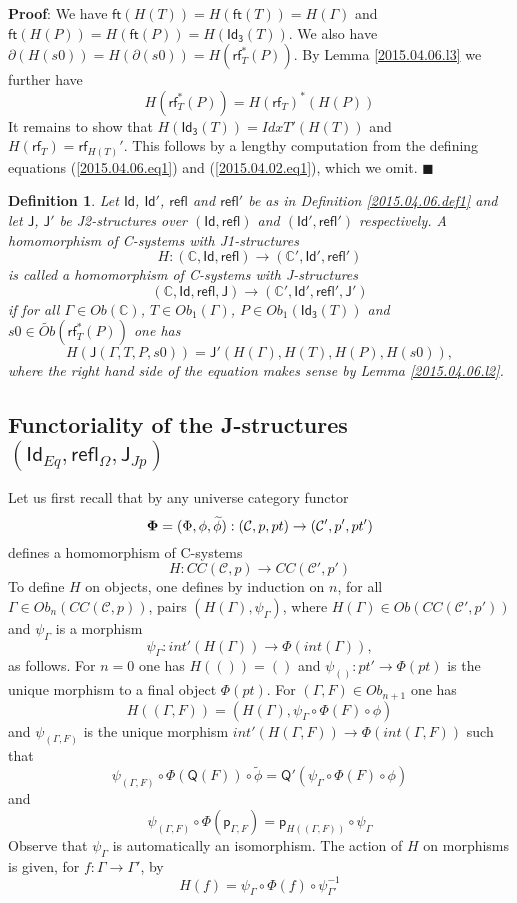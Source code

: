 \documentclass[12pt]{article}
\numberwithin{equation}{section}
\newenvironment{myproof}{{\bf Proof}:}{$\blacksquare$ \vskip 5mm }
\newtheorem{definition}[proposition]{Definition}
\newcommand{\sr}{\rightarrow}
\newcommand{\wt}{\widetilde}
\newcommand{\toCC}{CC} %
\newcommand{\CC}{{\mathbb C}}  %
\newcommand{\C}{{\mathcal C}}  %
\newcommand{\ft}{\mathsf{ft}}
\newcommand{\p}{\mathsf{p}}
\newcommand{\Id}{\mathsf{Id}} %
\newcommand{\Idx}{\mathsf{Id_3}} %
\newcommand{\refl}{\mathsf{refl}}
\newcommand{\J}{\mathsf{J}}
\newcommand{\rf}{\mathsf{rf}}
\newcommand{\Q}{\mathsf{Q}}
\newcommand{\Obwt}{\wt{Ob}}
\begin{document}
%
\begin{myproof}
We have $\ft(H(T))=H(\ft(T))=H(\Gamma)$ and $\ft(H(P))=H(\ft(P))=H(\Idx(T))$. We
also have $\partial(H(s0))=H(\partial(s0))=H(\rf_T^*(P))$. By Lemma
\ref{2015.04.06.l3} we further have
%
$$H(\rf_T^*(P))=H(\rf_T)^*(H(P))$$
%
It remains to show that $H(\Idx(T))=IdxT'(H(T))$ and $H(\rf_T)=\rf_{H(T)}'$. This
follows by a lengthy computation from the defining
equations (\ref{2015.04.06.eq1}) and (\ref{2015.04.02.eq1}), which we omit.
\end{myproof}
%
\begin{definition}
\label{2015.04.06.def2} Let $\Id$, $\Id'$, $\refl$ and $\refl'$ be as in
Definition \ref{2015.04.06.def1} and let $\J$, $\J'$ be J2-structures over
$(\Id,\refl)$ and $(\Id',\refl')$ respectively. A homomorphism of C-systems with
J1-structures
%
$$H:(\CC,\Id,\refl)\sr (\CC',\Id',\refl')$$
%
is called a homomorphism of C-systems with J-structures
%
$$(\CC,\Id,\refl,\J)\sr (\CC',\Id',\refl',\J')$$
%
if for all $\Gamma\in Ob(\CC)$, $T\in Ob_1(\Gamma)$, $P\in Ob_1(\Idx(T))$ and
$s0\in \Obwt(\rf_T^*(P))$ one has
%
$$H(\J(\Gamma,T,P,s0))=\J'(H(\Gamma),H(T),H(P),H(s0)),$$
%
where the right hand side of the equation makes sense by Lemma
\ref{2015.04.06.l2}.
\end{definition}
%











\subsection{Functoriality of the J-structures $(\Id_{Eq},\refl_{\Omega},\J_{Jp})$}
%
\label{2015.04.12.sec1}
%
Let us first recall that by \cite[Construction 3.3]{Cfromauniverse} any
universe category functor $${\bf \Phi}=(\Phi,\phi,\wt{\phi}) : (\C,p,pt) \to (\C',p',pt')$$ defines a
homomorphism of C-systems
%
$$H:\toCC({\C},p)\sr \toCC({\C}',p')$$
%
To define $H$ on objects, one defines by induction on $n$, for all $\Gamma\in
Ob_n(\toCC({\C},p))$, pairs $(H(\Gamma),\psi_{\Gamma})$, where
$H(\Gamma)\in Ob(\toCC({\C}',p'))$ and $\psi_{\Gamma}$ is a morphism
%
$$\psi_{\Gamma}:int'(H(\Gamma))\sr \Phi(int(\Gamma)),$$
%
as follows. For $n=0$ one has $H(())=()$ and $\psi_{()}:pt'\sr \Phi(pt)$ is the
unique morphism to a final object $\Phi(pt)$. For $(\Gamma,F)\in Ob_{n+1}$ one
has
%
$$H((\Gamma,F))=(H(\Gamma),\psi_{\Gamma}\circ\Phi(F)\circ \phi)$$
%
and $\psi_{(\Gamma,F)}$ is the unique morphism $int'(H(\Gamma,F))\sr
\Phi(int(\Gamma,F))$ such that
%
$$\psi_{(\Gamma,F)}\circ
\Phi(\Q(F))\circ\wt{\phi}=\Q'(\psi_{\Gamma}\circ\Phi(F)\circ\phi)$$
%
and
%
$$\psi_{(\Gamma,F)}\circ \Phi(\p_{\Gamma,F})=\p_{H((\Gamma,F))}\circ
\psi_{\Gamma}$$
%
Observe that $\psi_{\Gamma}$ is automatically an isomorphism. The action of $H$
on morphisms is given, for $f:\Gamma\sr\Gamma'$, by
%
$$H(f)=\psi_{\Gamma}\circ\Phi(f)\circ\psi_{\Gamma'}^{-1}$$
%
\end{document}
